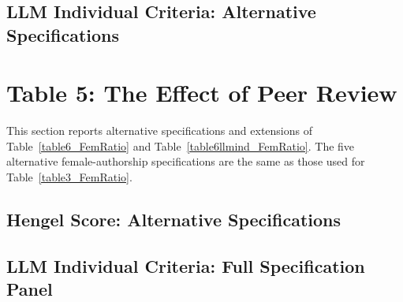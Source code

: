\subsection{LLM Individual Criteria: Alternative Specifications}\label{app:sec:table3_llm_ind_robust}












\clearpage

\section{Table 5: The Effect of Peer Review}\label{sec:Robust}

This section reports alternative specifications and extensions of Table~\ref{table6_FemRatio} and Table~\ref{table6llmind_FemRatio}. The five alternative female-authorship specifications are the same as those used for Table~\ref{table3_FemRatio}.

\subsection{Hengel Score: Alternative Specifications}\label{app:sec:table5_hengel_robust}







\clearpage

\subsection{LLM Individual Criteria: Full Specification Panel}\label{app:sec:table5_llm_ind}














